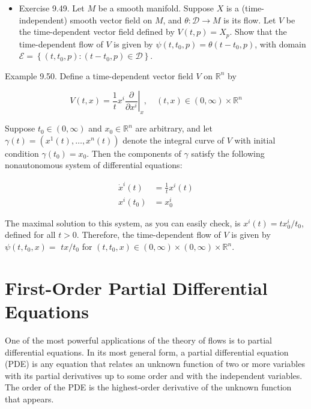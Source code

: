 \documentclass[10pt]{article}
\begin{document}
\begin{itemize}
  \item Exercise 9.49. Let $M$ be a smooth manifold. Suppose $X$ is a (time-independent) smooth vector field on $M$, and $\theta: \mathscr{D} \rightarrow M$ is its flow. Let $V$ be the time-dependent vector field defined by $V(t, p)=X_{p}$. Show that the time-dependent flow of $V$ is given by $\psi\left(t, t_{0}, p\right)=\theta\left(t-t_{0}, p\right)$, with domain $\mathcal{E}=\left\{\left(t, t_{0}, p\right):\left(t-t_{0}, p\right) \in \mathscr{D}\right\}$.
\end{itemize}

Example 9.50. Define a time-dependent vector field $V$ on $\mathbb{R}^{n}$ by

$$
V(t, x)=\left.\frac{1}{t} x^{i} \frac{\partial}{\partial x^{i}}\right|_{x}, \quad(t, x) \in(0, \infty) \times \mathbb{R}^{n}
$$

Suppose $t_{0} \in(0, \infty)$ and $x_{0} \in \mathbb{R}^{n}$ are arbitrary, and let $\gamma(t)=\left(x^{1}(t), \ldots, x^{n}(t)\right)$ denote the integral curve of $V$ with initial condition $\gamma\left(t_{0}\right)=x_{0}$. Then the components of $\gamma$ satisfy the following nonautonomous system of differential equations:

$$
\begin{aligned}
\dot{x}^{i}(t) & =\frac{1}{t} x^{i}(t) \\
x^{i}\left(t_{0}\right) & =x_{0}^{i}
\end{aligned}
$$

The maximal solution to this system, as you can easily check, is $x^{i}(t)=t x_{0}^{i} / t_{0}$, defined for all $t>0$. Therefore, the time-dependent flow of $V$ is given by $\psi\left(t, t_{0}, x\right)=$ $t x / t_{0}$ for $\left(t, t_{0}, x\right) \in(0, \infty) \times(0, \infty) \times \mathbb{R}^{n}$.

\section*{First-Order Partial Differential Equations}
One of the most powerful applications of the theory of flows is to partial differential equations. In its most general form, a partial differential equation (PDE) is any equation that relates an unknown function of two or more variables with its partial derivatives up to some order and with the independent variables. The order of the PDE is the highest-order derivative of the unknown function that appears.
\end{document}
